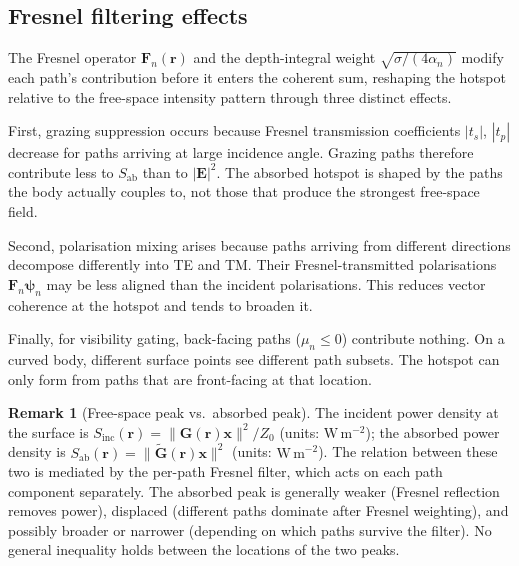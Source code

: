 \documentclass[11pt,a4paper]{article}
\theoremstyle{definition}      %
\newtheorem{remark}[remark]{Remark}
\newcommand{\Sab}{S_{\mathrm{ab}}}
\begin{document}
\subsection{Fresnel filtering effects}\label{sec:fresnel-filter}

The Fresnel operator $\mathbf{F}_n(\mathbf{r})$ and the
depth-integral weight $\sqrt{\sigma/(4\alpha_n)}$ modify each path's
contribution before it enters the coherent sum, reshaping the hotspot
relative to the free-space intensity pattern through three distinct effects.

First, grazing suppression occurs because Fresnel transmission coefficients
$|t_s|$, $|t_p|$ decrease for paths arriving at large incidence
angle.  Grazing paths therefore contribute less to $\Sab$ than to
$|\mathbf{E}|^2$.  The absorbed hotspot is shaped by the paths the
body actually couples to, not those that produce the strongest
free-space field.

Second, polarisation mixing arises because paths arriving from different
directions decompose differently into TE and TM. Their
Fresnel-transmitted polarisations $\mathbf{F}_n\boldsymbol{\psi}_n$
may be less aligned than the incident polarisations.  This reduces
vector coherence at the hotspot and tends to broaden it.

Finally, for visibility gating, back-facing paths ($\mu_n \leq 0$)
contribute nothing.  On a curved body, different surface points see
different path subsets.  The hotspot can only form from paths that
are front-facing at that location.

\begin{remark}[Free-space peak vs.\ absorbed peak]
The incident power density at the surface is
$S_\mathrm{inc}(\mathbf{r}) = \|\mathbf{G}(\mathbf{r})\mathbf{x}\|^2/Z_0$
(units: $\mathrm{W\,m^{-2}}$); the absorbed power density
is $\Sab(\mathbf{r}) = \|\tilde{\mathbf{G}}(\mathbf{r})\mathbf{x}\|^2$
(units: $\mathrm{W\,m^{-2}}$).
The relation between these two is mediated by the per-path Fresnel
filter, which acts on each path component separately.  The absorbed
peak is generally weaker (Fresnel reflection removes power),
displaced (different paths dominate after Fresnel weighting), and
possibly broader or narrower (depending on which paths survive the
filter).  No general inequality holds between the locations of the
two peaks.
\end{remark}

\end{document}
